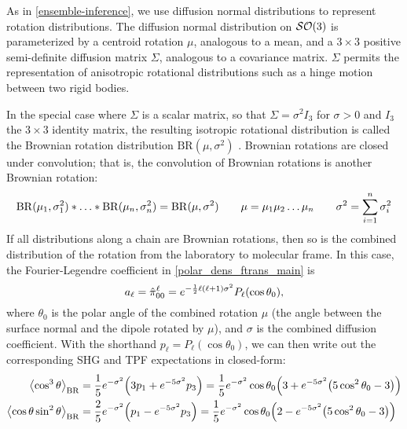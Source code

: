 \documentclass[../../main.tex]{subfiles}
\begin{document}
\begin{refsection}
	As in \cref{ensemble-inference}, we use diffusion normal distributions to represent rotation distributions.
	The diffusion normal distribution on $\mathcal{SO} (3)$ is parameterized by a centroid rotation $\mu$, analogous to a mean, and a $3 \times 3$ positive semi-definite diffusion matrix $\Sigma$, analogous to a covariance matrix.
	$\Sigma$ permits the representation of anisotropic rotational distributions such as a hinge motion between two rigid bodies.

	In the special case where $\Sigma$ is a scalar matrix, so that $\Sigma=\sigma^2 I_3$ for $\sigma > 0$ and $I_3$ the $3 \times 3$ identity matrix, the resulting isotropic rotational distribution is called the Brownian rotation distribution $\mathrm{BR}(\mu, \sigma^2)$ \supercite{perrinEtudeMathematiqueMouvement1928,nikolayevNormalDistributionRotation1997}.
	Brownian rotations are closed under convolution; that is, the convolution of Brownian rotations is another Brownian rotation:
	\begin{equation}
		\mathrm{BR}(\mu_1, \sigma_1^2) * \ldots * \mathrm{BR}(\mu_n, \sigma_n^2) = \mathrm{BR}(\mu, \sigma^2) \qquad \mu = \mu_1 \mu_2 \ldots \mu_n\qquad \sigma^2 = \sum_{i=1}^n \sigma_i^2
	\end{equation}
	If all distributions along a chain are Brownian rotations, then so is the combined distribution of the rotation from the laboratory to molecular frame.
	In this case, the Fourier-Legendre coefficient in \cref{polar_dens_ftrans_main} is
	\begin{equation}
		a_\ell = \hat{\pi}^\ell_{00} = e^{-\frac{1}{2} \ell(\ell + 1) \sigma^2} P_\ell(\cos\theta_0),
	\end{equation}
	where $\theta_0$ is the polar angle of the combined rotation $\mu$ (\ie the angle between the surface normal and the dipole rotated by $\mu$), and $\sigma$ is the combined diffusion coefficient.
	With the shorthand $p_\ell = P_\ell(\cos\theta_0)$, we can then write out the corresponding SHG and TPF expectations in closed-form:
	\begin{align}
		\begin{split}
			\expect{\cos^3\theta}{\mathrm{BR}}
			&= \frac{1}{5} e^{-\sigma^2} \qty(3 p_1 + e^{-5 \sigma^2} p_3)
			= \frac{1}{5} e^{-\sigma^2} \cos\theta_0 \qty(3 + e^{-5\sigma^2} \qty(5 \cos^2\theta_0 - 3))\\
			\expect{\cos\theta \sin^2\theta}{\mathrm{BR}}
			&= \frac{2}{5} e^{-\sigma^2} \qty(p_1 - e^{-5 \sigma^2} p_3)
			= \frac{1}{5} e^{-\sigma^2} \cos\theta_0 \qty(2 - e^{-5\sigma^2} \qty(5 \cos^2\theta_0 - 3))\\

\end{split}
\end{align}
\end{refsection}
\end{document}
